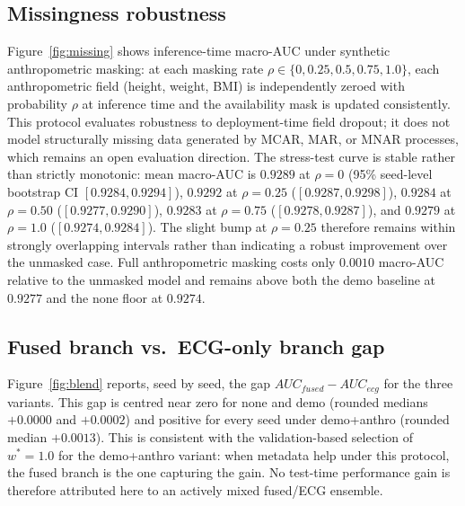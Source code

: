 \documentclass[mathematics,article,submit,pdftex]{Definitions/mdpi}
\def\texttt#1{#1}%
\def\mathrm#1{#1}%
\begin{document}
\subsection{Missingness robustness}
Figure~\ref{fig:missing} shows inference-time macro-AUC under synthetic anthropometric masking: at each masking rate $\rho \in \{0, 0.25, 0.5, 0.75, 1.0\}$, each anthropometric field (height, weight, BMI) is independently zeroed with probability $\rho$ at inference time and the availability mask is updated consistently. This protocol evaluates robustness to deployment-time field dropout; it does not model structurally missing data generated by MCAR, MAR, or MNAR processes, which remains an open evaluation direction. The stress-test curve is stable rather than strictly monotonic: mean macro-AUC is $0.9289$ at $\rho{=}0$ (95\% seed-level bootstrap CI $[0.9284, 0.9294]$), $0.9292$ at $\rho{=}0.25$ ($[0.9287, 0.9298]$), $0.9284$ at $\rho{=}0.50$ ($[0.9277, 0.9290]$), $0.9283$ at $\rho{=}0.75$ ($[0.9278, 0.9287]$), and $0.9279$ at $\rho{=}1.0$ ($[0.9274, 0.9284]$). The slight bump at $\rho{=}0.25$ therefore remains within strongly overlapping intervals rather than indicating a robust improvement over the unmasked case. Full anthropometric masking costs only $0.0010$ macro-AUC relative to the unmasked model and remains above both the \texttt{demo} baseline at $0.9277$ and the \texttt{none} floor at $0.9274$.

\subsection{Fused branch vs.\ ECG-only branch gap}
Figure~\ref{fig:blend} reports, seed by seed, the gap $\mathrm{AUC}_{\mathrm{fused}} - \mathrm{AUC}_{\mathrm{ecg}}$ for the three variants. This gap is centred near zero for \texttt{none} and \texttt{demo} (rounded medians $+0.0000$ and $+0.0002$) and positive for every seed under \texttt{demo+anthro} (rounded median $+0.0013$). This is consistent with the validation-based selection of $w^{\ast}{=}1.0$ for the \texttt{demo+anthro} variant: when metadata help under this protocol, the fused branch is the one capturing the gain. No test-time performance gain is therefore attributed here to an actively mixed fused/ECG ensemble.
\end{document}
